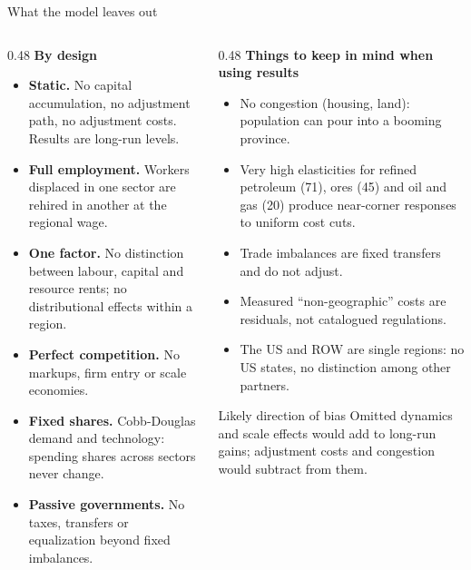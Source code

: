 \documentclass[aspectratio=169,9pt,t]{beamer}
\newcommand{\key}[1]{\textbf{\color{ipnavy}#1}}
\begin{document}
\begin{frame}{What the model leaves out}
  \begin{columns}[T]
    \begin{column}{0.48\textwidth}
      \textbf{By design}
      \begin{itemize}
        \item \key{Static.} No capital accumulation, no adjustment path,
              no adjustment costs. Results are long-run levels.
        \item \key{Full employment.} Workers displaced in one sector are
              rehired in another at the regional wage.
        \item \key{One factor.} No distinction between labour, capital and
              resource rents; no distributional effects within a region.
        \item \key{Perfect competition.} No markups, firm entry or
              scale economies.
        \item \key{Fixed shares.} Cobb-Douglas demand and technology:
              spending shares across sectors never change.
        \item \key{Passive governments.} No taxes, transfers or
              equalization beyond fixed imbalances.
      \end{itemize}
    \end{column}
    \begin{column}{0.48\textwidth}
      \textbf{Things to keep in mind when using results}
      \begin{itemize}
        \item No congestion (housing, land): population can pour into a
              booming province.
        \item Very high elasticities for refined petroleum (71), ores
              (45) and oil and gas (20) produce near-corner responses to
              uniform cost cuts.
        \item Trade imbalances are fixed transfers and do not adjust.
        \item Measured ``non-geographic'' costs are residuals, not
              catalogued regulations.
        \item The US and ROW are single regions: no US states, no
              distinction among other partners.
      \end{itemize}
      \begin{block}{Likely direction of bias}
        \small Omitted dynamics and scale effects would add to
        long-run gains; adjustment costs and congestion would subtract
        from them.
      \end{block}
    \end{column}
  \end{columns}
\end{frame}
\end{document}
